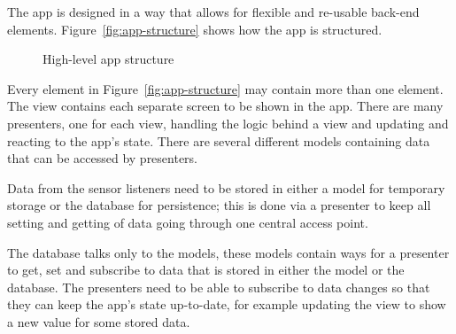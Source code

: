 The app is designed in a way that allows for flexible and re-usable back-end elements. Figure~\vref{fig:app-structure} shows how the app is structured.

\begin{figure}[ht]
  \centering
  \begin{scaletikzpicturetowidth}{\linewidth}
  \end{scaletikzpicturetowidth}
  \caption{High-level app structure}\label{fig:app-structure}
\end{figure}

Every element in Figure~\vref{fig:app-structure} may contain more than one element. The view contains each separate screen to be shown in the app. There are many presenters, one for each view, handling the logic behind a view and updating and reacting to the app's state. There are several different models containing data that can be accessed by presenters.

Data from the sensor listeners need to be stored in either a model for temporary storage or the database for persistence; this is done via a presenter to keep all setting and getting of data going through one central access point.

The database talks only to the models, these models contain ways for a presenter to get, set and subscribe to data that is stored in either the model or the database. The presenters need to be able to subscribe to data changes so that they can keep the app's state up-to-date, for example updating the view to show a new value for some stored data.

